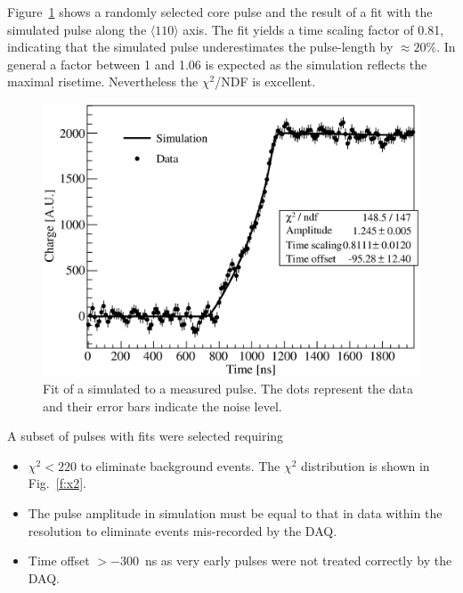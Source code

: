 \documentclass[epj,referee]{svjour}
\begin{document}
Figure~\ref{f:s2d} shows a randomly selected core pulse and the result
of a fit with the simulated pulse along the $\langle 110 \rangle$
axis. The fit yields a time scaling factor of 0.81, indicating that
the simulated pulse underestimates the pulse-length by $\approx
20\%$. In general a factor between 1 and 1.06 is expected as the
simulation reflects the maximal risetime. Nevertheless the
$\chi^{2}$/NDF is excellent.
\begin{figure}[htbp]
\centering
\includegraphics[width=\linewidth]{PSs2d}
\caption{Fit of a simulated to a measured pulse. The dots represent
the data and their error bars indicate the noise level.}
\label{f:s2d}
\end{figure}

A subset of pulses with fits were selected requiring
\begin{itemize}
\item $\chi^{2} < 220$ to eliminate background events. The $\chi^{2}$
distribution is shown in Fig.~\ref{f:x2}.
\item The pulse amplitude in simulation must be equal to that in data
within the resolution to eliminate events mis-recorded by the DAQ.
\item Time offset $> -300$~ns as very early pulses were not treated
correctly by the DAQ.
\end{itemize}
\end{document}
